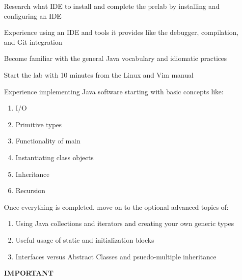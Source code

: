 \documentclass[../../main.tex]{subfiles}
\begin{document}
\begin{steps}
   \item Research what IDE to install and complete the prelab by installing and configuring an IDE
   \item Experience using an IDE and tools it provides like the debugger, compilation, and Git
      integration
   \item Become familiar with the general Java vocabulary and idiomatic practices
   \item Start the lab with 10 minutes from the Linux and Vim manual
   \item Experience implementing Java software starting with basic concepts like:
   \begin{enumerate}[label=\Alph*.]
         \item I/O
         \item Primitive types
         \item Functionality of main
         \item Instantiating class objects
         \item Inheritance
         \item Recursion
      \end{enumerate}
   \item Once everything is completed, move on to the optional advanced topics of:
   \begin{enumerate}[label=\Alph*.]
         \item Using Java collections and iterators and creating your own generic types
         \item Useful usage of static and initialization blocks
         \item Interfaces versus Abstract Classes and psuedo-multiple inheritance
      \end{enumerate}
\end{steps}

\vspace{5cm}

\begin{center}
   {\Huge\bfseries IMPORTANT}
\end{center}

\end{document}
